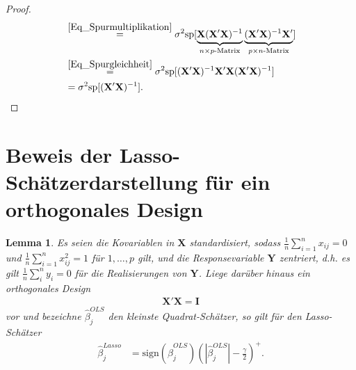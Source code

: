 \documentclass[12pt, a4paper]{report}\usepackage[]{graphicx}\usepackage[]{color}
\newtheorem{lemma}{Lemma}
\begin{document}
\begin{appendix}
\begin{proof}
\begin{align}
&\stackrel{\eqref{Eq_Spurmultiplikation}}{=}\sigma^2\text{sp}[\underbrace{\mathbf{X}(\mathbf{X}'\mathbf{X})^{-1}}_{\substack{n \times p \text{-Matrix}}}\underbrace{(\mathbf{X}'\mathbf{X})^{-1}\mathbf{X}'}_{\substack{p \times n \text{-Matrix}}}] \notag \\
&\stackrel{\eqref{Eq_Spurgleichheit}}{=}\sigma^2\text{sp}[(\mathbf{X}'\mathbf{X})^{-1}\mathbf{X}'\mathbf{X}(\mathbf{X}'\mathbf{X})^{-1}] 
\notag \\
&=\sigma^2 \text{sp}[(\mathbf{X}'\mathbf{X})^{-1}]. 
\end{align}
\end{proof}

\section{Beweis der Lasso-Schätzerdarstellung für ein orthogonales Design}\label{App_Lasso_Orthogonal}
\begin{lemma}\label{Lemma_Lasso_Ortho}
Es seien die Kovariablen in $\mathbf{X}$ standardisiert, sodass $\frac{1}{n}\sum_{i=1}^{n}x_{ij}=0$ und $\frac{1}{n}\sum_{i=1}^{n}x_{ij}^2=1$ für $1,\dots, p$ gilt, und die Responsevariable $\mathbf{Y}$ zentriert,  d.h. es gilt $\frac{1}{n}\sum_{i}^{n}y_i =0$ für die Realisierungen von $\mathbf{Y}$. Liege darüber hinaus ein orthogonales Design
\begin{align}\label{Eq_Kovarianz_Ortho}
\mathbf{X}'\mathbf{X}=\mathbf{I}
\end{align}
vor und bezeichne $\hat{\beta}_j^{OLS}$ den kleinste Quadrat-Schätzer, so gilt für den Lasso-Schätzer
\begin{align*}
\hat{\beta}_j^{Lasso}&=\text{sign}(\hat{\beta}_j^{OLS})(|\hat{\beta}_j^{OLS}|-\frac{\gamma}{2})^+ .
\end{align*}
\end{lemma}


\end{appendix}
\end{document}
